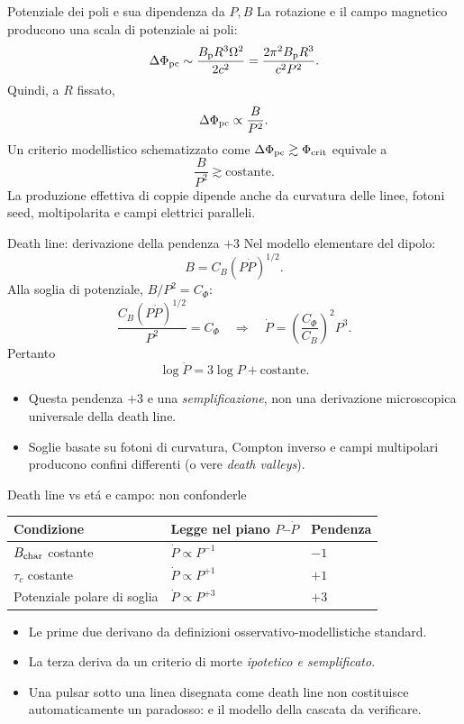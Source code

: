 \begin{frame}[t]{Potenziale dei poli e sua dipendenza da $P,B$}
\small
La rotazione e il campo magnetico producono una scala di potenziale ai poli:
\[
\Delta\Phi_{\rm pc}\sim\frac{B_{\rm p}R^3\Omega^2}{2c^2}
=\frac{2\pi^2B_{\rm p}R^3}{c^2P^2}.
\]
Quindi, a $R$ fissato,
\[
\Delta\Phi_{\rm pc}\propto\frac{B}{P^2}.
\]
Un criterio modellistico schematizzato come $\Delta\Phi_{\rm pc}\gtrsim\Phi_{\rm crit}$ equivale a
\[
\frac B{P^2}\gtrsim\mathrm{costante}.
\]
La produzione effettiva di coppie dipende anche da curvatura delle linee, fotoni seed, moltipolarita e campi elettrici paralleli.
\end{frame}

\begin{frame}[t]{Death line: derivazione della pendenza $+3$}
\small
Nel modello elementare del dipolo:
\[
B=C_B(P\dot P)^{1/2}.
\]
Alla soglia di potenziale, $B/P^2=C_\Phi$:
\[
\frac{C_B(P\dot P)^{1/2}}{P^2}=C_\Phi
\quad\Rightarrow\quad
\dot P=\left(\frac{C_\Phi}{C_B}\right)^2P^3.
\]
Pertanto
\[
\log\dot P=3\log P+\mathrm{costante}.
\]
\begin{itemize}
\item Questa pendenza $+3$ e una \emph{semplificazione}, non una derivazione microscopica universale della death line.
\item Soglie basate su fotoni di curvatura, Compton inverso e campi multipolari producono confini differenti (o vere \emph{death valleys}).
\end{itemize}
\end{frame}

\begin{frame}[t]{Death line vs et\'a e campo: non confonderle}
\smallskip
\small
\begin{tabular}{@{}lll@{}}
\toprule
Condizione & Legge nel piano $P$--$\dot P$ & Pendenza \\
\midrule
$B_{\rm char}$ costante & $\dot P\propto P^{-1}$ & $-1$ \\
$\tau_c$ costante & $\dot P\propto P^{+1}$ & $+1$ \\
Potenziale polare di soglia & $\dot P\propto P^{+3}$ & $+3$ \\
\bottomrule
\end{tabular}
\medskip
\begin{itemize}
\item Le prime due derivano da definizioni osservativo-modellistiche standard.
\item La terza deriva da un criterio di morte \emph{ipotetico e semplificato}.
\item Una pulsar sotto una linea disegnata come death line non costituisce automaticamente un paradosso: e il modello della cascata da verificare.
\end{itemize}
\end{frame}


